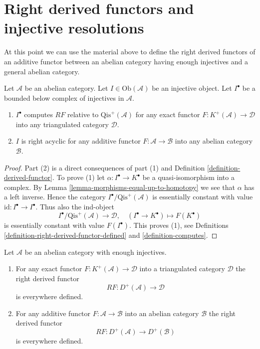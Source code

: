 \section{Right derived functors and injective resolutions}
\label{section-right-derived-functor}

\noindent
At this point we can use the material above to define the right derived
functors of an additive functor between an abelian category having
enough injectives and a general abelian category.

\begin{lemma}
\label{lemma-injective-acyclic}
Let $\mathcal{A}$ be an abelian category.
Let $I \in \text{Ob}(\mathcal{A})$ be an injective object.
Let $I^\bullet$ be a bounded below complex of injectives in $\mathcal{A}$.
\begin{enumerate}
\item $I^\bullet$ computes $RF$ relative to $\text{Qis}^{+}(\mathcal{A})$
for any exact functor $F : K^{+}(\mathcal{A}) \to \mathcal{D}$
into any triangulated category $\mathcal{D}$.
\item $I$ is right acyclic for any additive functor
$F : \mathcal{A} \to \mathcal{B}$ into any abelian category $\mathcal{B}$.
\end{enumerate}
\end{lemma}

\begin{proof}
Part (2) is a direct consequences of part (1) and
Definition \ref{definition-derived-functor}.
To prove (1) let $\alpha : I^\bullet \to K^\bullet$ be a quasi-isomorphism
into a complex. By
Lemma \ref{lemma-morphisms-equal-up-to-homotopy}
we see that $\alpha$ has a left inverse. Hence the category
$I^\bullet/\text{Qis}^{+}(\mathcal{A})$ is essentially constant with value
$\text{id} : I^\bullet \to I^\bullet$. Thus also the ind-object
$$
I^\bullet/\text{Qis}^{+}(\mathcal{A}) \longrightarrow \mathcal{D},\quad
(I^\bullet \to K^\bullet) \longmapsto F(K^\bullet)
$$
is essentially constant with value $F(I^\bullet)$. This proves (1), see
Definitions \ref{definition-right-derived-functor-defined} and
\ref{definition-computes}.
\end{proof}

\begin{lemma}
\label{lemma-enough-injectives-right-derived}
Let $\mathcal{A}$ be an abelian category with enough injectives.
\begin{enumerate}
\item For any exact functor $F : K^{+}(\mathcal{A}) \to \mathcal{D}$
into a triangulated category $\mathcal{D}$ the right derived
functor
$$
RF : D^{+}(\mathcal{A}) \longrightarrow \mathcal{D}
$$
is everywhere defined.
\item For any additive functor $F : \mathcal{A} \to \mathcal{B}$ into an
abelian category $\mathcal{B}$ the right derived functor
$$
RF : D^{+}(\mathcal{A}) \longrightarrow D^{+}(\mathcal{B})
$$
is everywhere defined.
\end{enumerate}
\end{lemma}

